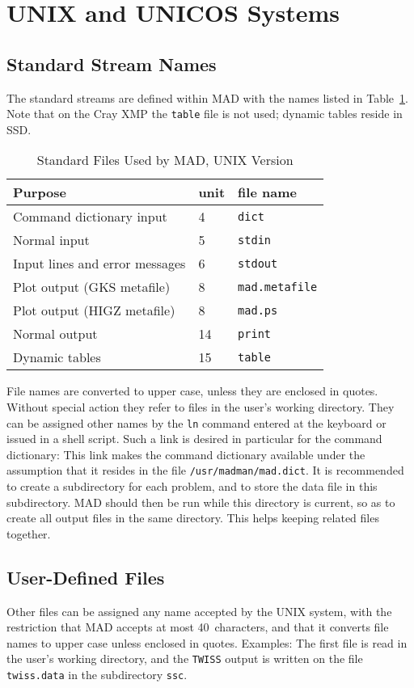 \section{UNIX and UNICOS Systems}
\label{S-UNIX}
\subsection{Standard Stream Names}
The standard streams are defined within MAD with the names listed in
Table~\ref{T-UNIX}.
Note that on the Cray XMP the {\tt table} file is not used;
dynamic tables reside in SSD.
\begin{table}[ht]
\caption{Standard Files Used by MAD, UNIX Version}
\vspace{1ex}
\label{T-UNIX}
\centering
\begin{tabular}{|l|l|l|}
\hline
Purpose                         &unit  &file name \\
\hline
Command dictionary input        & 4    &{\tt dict} \\
Normal input                    & 5    &{\tt stdin} \\
Input lines and error messages  & 6    &{\tt stdout} \\
Plot output (GKS metafile)      & 8    &{\tt mad.metafile} \\
Plot output (HIGZ metafile)     & 8    &{\tt mad.ps} \\
Normal output                   &14    &{\tt print} \\
Dynamic tables                  &15    &{\tt table} \\
\hline
\end{tabular}
\end{table}
File names are converted to upper case, unless they are enclosed in quotes.
Without special action they refer to files in the
user's working directory.
They can be assigned other names by the {\tt ln} command
entered at the keyboard or issued in a shell script.
Such a link is desired in particular for the command dictionary:
This link makes the command dictionary available under the assumption
that it resides in the file {\tt /usr/madman/mad.dict}.
It is recommended to create a subdirectory for each problem,
and to store the data file in this subdirectory.
MAD should then be run while this directory is current,
so as to create all output files in the same directory.
This helps keeping related files together.

\subsection{User-Defined Files}
Other files can be assigned any name accepted by the UNIX system,
with the restriction that MAD accepts at most 40~characters,
and that it converts file names to upper case unless enclosed in quotes.
Examples:
The first file is read in the user's working directory,
and the {\tt TWISS} output is written on the file {\tt twiss.data}
in the subdirectory {\tt ssc}.

